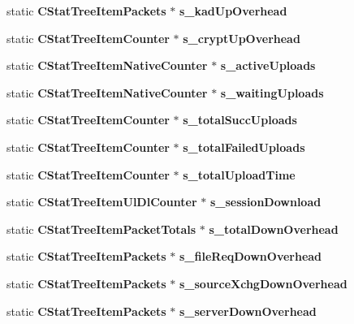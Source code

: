 \begin{DoxyCompactItemize}
\item 
static {\bf CStatTreeItemPackets} $\ast$ {\bfseries s\_\-kadUpOverhead}\label{classCStatistics_a57bde74aa071eaeea86e07cd29b2e6fc}

\item 
static {\bf CStatTreeItemCounter} $\ast$ {\bfseries s\_\-cryptUpOverhead}\label{classCStatistics_ad8a5a89eed2fc9c83ce44f45ff4461ad}

\item 
static {\bf CStatTreeItemNativeCounter} $\ast$ {\bfseries s\_\-activeUploads}\label{classCStatistics_aebd01240a554a6bcfcb4c9a6c0448dfb}

\item 
static {\bf CStatTreeItemNativeCounter} $\ast$ {\bfseries s\_\-waitingUploads}\label{classCStatistics_abe72bda57867c279f8e7a97d26f207f1}

\item 
static {\bf CStatTreeItemCounter} $\ast$ {\bfseries s\_\-totalSuccUploads}\label{classCStatistics_aae2fc178834a4132a73144ac3eb0f7cd}

\item 
static {\bf CStatTreeItemCounter} $\ast$ {\bfseries s\_\-totalFailedUploads}\label{classCStatistics_adfc7caa35d4b4f04d21218306c522eb2}

\item 
static {\bf CStatTreeItemCounter} $\ast$ {\bfseries s\_\-totalUploadTime}\label{classCStatistics_aaeef5b53122dabfe6dc6f9bdb02f3e8d}

\item 
static {\bf CStatTreeItemUlDlCounter} $\ast$ {\bfseries s\_\-sessionDownload}\label{classCStatistics_a0bdf88c36d29679aa45b674b3dd00572}

\item 
static {\bf CStatTreeItemPacketTotals} $\ast$ {\bfseries s\_\-totalDownOverhead}\label{classCStatistics_ada935028a0fb270ed86609ed6e455181}

\item 
static {\bf CStatTreeItemPackets} $\ast$ {\bfseries s\_\-fileReqDownOverhead}\label{classCStatistics_a0137bd2e763b14f6ceb6967cc9453c43}

\item 
static {\bf CStatTreeItemPackets} $\ast$ {\bfseries s\_\-sourceXchgDownOverhead}\label{classCStatistics_a1fcbc911b75131dbc2b4553c5b0107cf}

\item 
static {\bf CStatTreeItemPackets} $\ast$ {\bfseries s\_\-serverDownOverhead}\label{classCStatistics_a333a5b9895b5d74423f0f585e9ef2bf4}


\end{DoxyCompactItemize}
